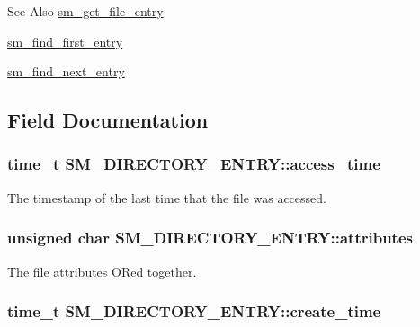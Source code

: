 \begin{DoxySeeAlso}{See Also}
\hyperlink{sm_8h_ae42546f1d89f496dc21f12b9291a4019}{sm\-\_\-get\-\_\-file\-\_\-entry} 

\hyperlink{sm_8h_a05c051930d83c1c79324bc1b1ef3aff4}{sm\-\_\-find\-\_\-first\-\_\-entry} 

\hyperlink{sm_8h_a9dcd85a62788fcb043f5a7440d0157ad}{sm\-\_\-find\-\_\-next\-\_\-entry} 
\end{DoxySeeAlso}


\subsection{Field Documentation}
\hypertarget{struct_s_m___d_i_r_e_c_t_o_r_y___e_n_t_r_y_a1806d1e38d20746f32000cb56a7d4a66}{
\subsubsection[{access\-\_\-time}]{\setlength{\rightskip}{0pt plus 5cm}time\-\_\-t S\-M\-\_\-\-D\-I\-R\-E\-C\-T\-O\-R\-Y\-\_\-\-E\-N\-T\-R\-Y\-::access\-\_\-time}}\label{struct_s_m___d_i_r_e_c_t_o_r_y___e_n_t_r_y_a1806d1e38d20746f32000cb56a7d4a66}


The timestamp of the last time that the file was accessed. 

\hypertarget{struct_s_m___d_i_r_e_c_t_o_r_y___e_n_t_r_y_a1b43b135e34261ff5e40be95f2a93f39}{
\subsubsection[{attributes}]{\setlength{\rightskip}{0pt plus 5cm}unsigned char S\-M\-\_\-\-D\-I\-R\-E\-C\-T\-O\-R\-Y\-\_\-\-E\-N\-T\-R\-Y\-::attributes}}\label{struct_s_m___d_i_r_e_c_t_o_r_y___e_n_t_r_y_a1b43b135e34261ff5e40be95f2a93f39}


The file attributes O\-Red together. 

\hypertarget{struct_s_m___d_i_r_e_c_t_o_r_y___e_n_t_r_y_a2bbc971465695bc0fc7dc890a64848da}{
\subsubsection[{create\-\_\-time}]{\setlength{\rightskip}{0pt plus 5cm}time\-\_\-t S\-M\-\_\-\-D\-I\-R\-E\-C\-T\-O\-R\-Y\-\_\-\-E\-N\-T\-R\-Y\-::create\-\_\-time}}\label{struct_s_m___d_i_r_e_c_t_o_r_y___e_n_t_r_y_a2bbc971465695bc0fc7dc890a64848da}


